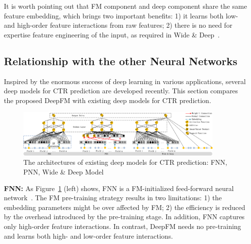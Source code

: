 It is worth pointing out that FM component and deep component share the same feature embedding, which brings two important benefits: 1) it learns both low- and high-order feature interactions from raw features; 2) there is no need for expertise feature engineering of the input, as required in Wide \& Deep~\cite{wide-n-deep}.

\subsection{Relationship with the other Neural Networks}\label{section:App:rela}

Inspired by the enormous success of deep learning in various applications, several deep models for CTR prediction are developed recently. This section compares the proposed DeepFM with existing deep models for CTR prediction.

\begin{figure}[ht]
\setlength{\abovecaptionskip}{0pt}%
\setlength{\belowcaptionskip}{-10pt}
\centering
\includegraphics[width=0.92\textwidth]{img/Other-model.png}
\caption{\footnotesize{The architectures of existing deep models for CTR prediction: FNN, PNN, Wide \& Deep Model}}\label{fig:othermodel}
\end{figure}


\noindent\textbf{FNN:} As Figure~\ref{fig:othermodel} (left) shows, FNN is a FM-initialized feed-forward neural network~\cite{fnn}. The FM pre-training strategy results in two limitations: 1) the embedding parameters might be over affected by FM; 2) the efficiency is reduced by the overhead introduced by the pre-training stage. In addition, FNN captures only high-order feature interactions. In contrast, DeepFM needs no pre-training and learns both high- and low-order feature interactions.


